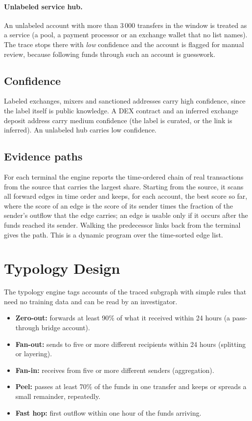 \paragraph{Unlabeled service hub.} An unlabeled account with more than 3\,000 transfers in the window is treated as a service (a pool, a payment processor or an exchange wallet that no list names). The trace stops there with \emph{low} confidence and the account is flagged for manual review, because following funds through such an account is guesswork.

\subsection{Confidence}
Labeled exchanges, mixers and sanctioned addresses carry high confidence, since the label itself is public knowledge. A DEX contract and an inferred exchange deposit address carry medium confidence (the label is curated, or the link is inferred). An unlabeled hub carries low confidence.

\subsection{Evidence paths}
For each terminal the engine reports the time-ordered chain of real transactions from the source that carries the largest share. Starting from the source, it scans all forward edges in time order and keeps, for each account, the best score so far, where the score of an edge is the score of its sender times the fraction of the sender's outflow that the edge carries; an edge is usable only if it occurs after the funds reached its sender. Walking the predecessor links back from the terminal gives the path. This is a dynamic program over the time-sorted edge list.

\section{Typology Design}
The typology engine tags accounts of the traced subgraph with simple rules that need no training data and can be read by an investigator.
\begin{itemize}
\item \textbf{Zero-out:} forwards at least 90\% of what it received within 24 hours (a pass-through bridge account).
\item \textbf{Fan-out:} sends to five or more different recipients within 24 hours (splitting or layering).
\item \textbf{Fan-in:} receives from five or more different senders (aggregation).
\item \textbf{Peel:} passes at least 70\% of the funds in one transfer and keeps or spreads a small remainder, repeatedly.
\item \textbf{Fast hop:} first outflow within one hour of the funds arriving.
\end{itemize}

